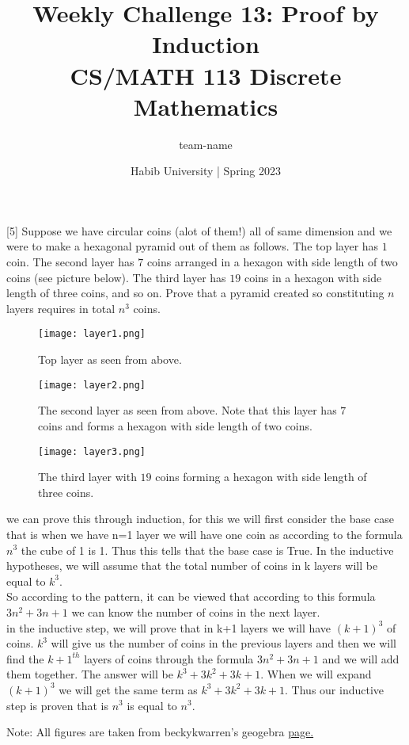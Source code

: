 \documentclass[a4paper]{exam}
\title{Weekly Challenge 13: Proof by Induction\\CS/MATH 113 Discrete Mathematics}
\author{team-name}  %
\date{Habib University | Spring 2023}
\begin{document}
\maketitle

\begin{questions}

  [5]
  Suppose we have circular coins (alot of them!) all of same dimension and we were to make a hexagonal pyramid out of them as follows. The top layer has $1$ coin. The second layer has $7$ coins arranged in a hexagon with side length of two coins (see picture below). The third layer has $19$ coins in a hexagon with side length of three coins, and so on. Prove that a pyramid created so constituting $n$ layers requires in total $n^3$ coins.
  \begin{figure}[h!]
    \centerline{\texttt{[image: layer1.png]}}
    \caption{Top layer as seen from above.}
    \label{layer1}
  \end{figure}
  \begin{figure}[h!]
    \centerline{\texttt{[image: layer2.png]}}
    \caption{The second layer as seen from above. Note that this layer has $7$ coins and forms a hexagon with side length of two coins.}
    \label{layer2}
  \end{figure}
  \newpage
  \begin{figure}[h!]
    \centerline{\texttt{[image: layer3.png]}}
    \caption{The third layer with $19$ coins forming a hexagon with side length of three coins.}
    \label{layer3}
  \end{figure}
  
  \begin{solution}
    we can prove this through induction, for this we will first consider the base case that is when we have n=1 layer we will have one coin as according to the formula $n^3$ the cube of 1 is 1. Thus this tells that the base case is True.
    In the inductive hypotheses, we will assume that the total 
    number of coins in k layers will be equal to $k^3$. 
    \\
    So according to the pattern, it can be viewed that according to this formula $3n^2+3n+1$ we can know the number of coins in the next layer. 
    \\
    in the inductive step, we will prove that in k+1 layers we will have $(k+1)^3$ of coins. $k^3$ will give us the number of coins in the previous layers and then we will find the ${k+1}^{th}$ layers of coins through the formula $3n^2+3n+1$ and we will add them together. The answer will be $k^3+3k^2+3k+1$. When we will expand $(k+1)^3$ we will get the same term as $k^3+3k^2+3k+1$. Thus our inductive step is proven that is $n^3$ is equal to $n^3$.
  
  \end{solution}

  Note: All figures are taken from beckykwarren's geogebra \href{https://www.geogebra.org/m/cnqdjcph}{page.}

\end{questions}
\end{document}
